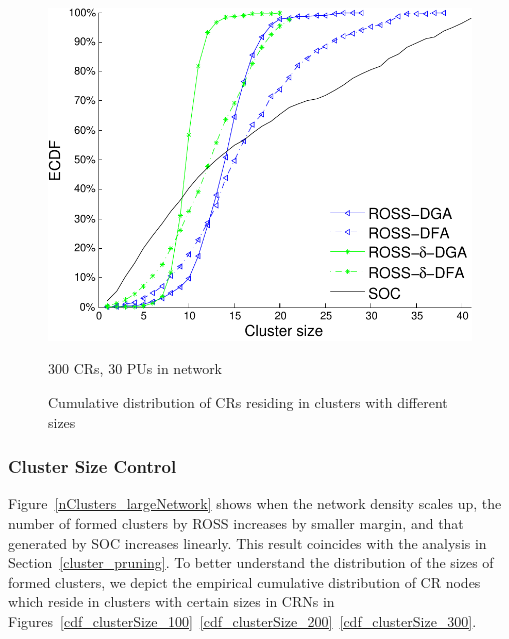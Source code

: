 \documentclass[10pt,journal,compsoc]{IEEEtran}
\theoremstyle{mytheoremstyle}
\theoremstyle{mytheoremstyle}
\theoremstyle{mytheoremstyle}
\begin{document}
\begin{figure}[t]
\begin{multicols}{3}
    \includegraphics[width=\linewidth]{cdf_clusterSize_300.pdf}\par\caption{300 CRs, 30 PUs in network}\label{cdf_clusterSize_300}
\end{multicols}
\caption{Cumulative distribution of CRs residing in clusters with different sizes}
\label{cdf_100_200_300}
\end{figure}

\subsubsection{Cluster Size Control}
Figure~\ref{nClusters_largeNetwork} shows when the network density scales up, the number of formed clusters by ROSS increases by smaller margin, and that generated by SOC increases linearly.
This result coincides with the analysis in Section~\ref{cluster_pruning}.
To better understand the distribution of the sizes of formed clusters, we depict the empirical cumulative distribution of CR nodes which reside in clusters with certain sizes in CRNs in Figures~\ref{cdf_clusterSize_100}~\ref{cdf_clusterSize_200}~\ref{cdf_clusterSize_300}.

\end{document}

